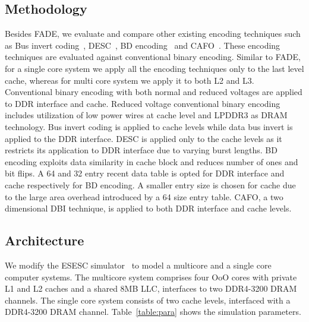 \subsection{Methodology}
Besides FADE, we evaluate and compare other existing encoding techniques such as Bus invert coding~\cite{bus-invert}, DESC~\cite{desc}, BD encoding~\cite{bdencoding} and CAFO~\cite{CAFO}. These encoding techniques are evaluated against conventional binary encoding. Similar to FADE, for a single core system we apply all the encoding techniques only to the last level cache, whereas for multi core system we apply it to both L2 and L3. Conventional binary encoding with both normal and reduced voltages are applied to DDR interface and cache. Reduced voltage conventional binary encoding includes utilization of low power wires at cache level and LPDDR3 as DRAM technology. Bus invert coding is applied to cache levels while data bus invert is applied to the DDR interface. DESC is applied only to the cache levels as it restricts its application to DDR interface due to varying burst lengths. BD encoding exploits data similarity in cache block and reduces number of ones and bit flips. A 64 and 32 entry recent data table is opted for DDR interface and cache respectively for BD encoding. A smaller entry size is chosen for cache due to the large area overhead introduced by a 64 size entry table. CAFO, a two dimensional DBI technique, is applied to both DDR interface and cache levels.

\subsection{Architecture}
We modify the ESESC simulator~\cite{ESESC} to model a multicore and a single core computer systems.
The multicore system comprises four OoO cores with private L1 and L2 caches and a shared 8MB LLC, interfaces to two DDR4-3200 DRAM channels.
The single core system consists of two cache levels, interfaced with a DDR4-3200 DRAM channel.
Table~\ref{table:para} shows the simulation parameters.

